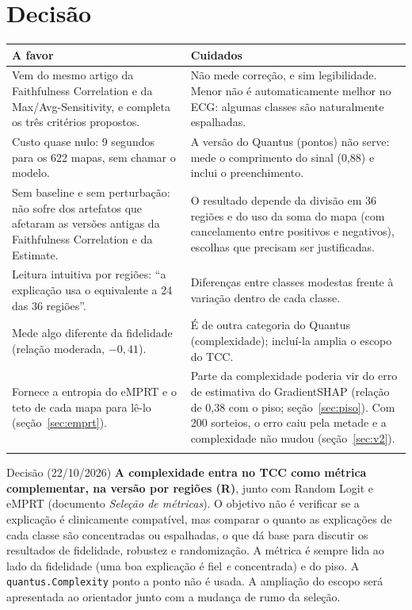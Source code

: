 \documentclass[11pt,a4paper]{article}
\begin{document}
\section{Decisão}\label{sec:decisao}
\begin{center}\small
\begin{tabularx}{\linewidth}{XX}
\toprule
\textbf{A favor} & \textbf{Cuidados} \\
\midrule
Vem do mesmo artigo da Faithfulness Correlation e da Max/Avg-Sensitivity, e completa os três critérios propostos. & Não mede correção, e sim legibilidade. Menor não é automaticamente melhor no ECG: algumas classes são naturalmente espalhadas. \\ \addlinespace
Custo quase nulo: 9 segundos para os 622 mapas, sem chamar o modelo. & A versão do Quantus (pontos) não serve: mede o comprimento do sinal (0,88) e inclui o preenchimento. \\ \addlinespace
Sem baseline e sem perturbação: não sofre dos artefatos que afetaram as versões antigas da Faithfulness Correlation e da Estimate. & O resultado depende da divisão em 36 regiões e do uso da soma do mapa (com cancelamento entre positivos e negativos), escolhas que precisam ser justificadas. \\ \addlinespace
Leitura intuitiva por regiões: “a explicação usa o equivalente a 24 das 36 regiões”. & Diferenças entre classes modestas frente à variação dentro de cada classe. \\ \addlinespace
Mede algo diferente da fidelidade (relação moderada, $-0{,}41$). & É de outra categoria do Quantus (complexidade); incluí-la amplia o escopo do TCC. \\ \addlinespace
Fornece a entropia do eMPRT e o teto de cada mapa para lê-lo (seção~\ref{sec:emprt}). & Parte da complexidade poderia vir do erro de estimativa do GradientSHAP (relação de 0,38 com o piso; seção~\ref{sec:piso}). Com 200 sorteios, o erro caiu pela metade e a complexidade não mudou (seção~\ref{sec:v2}). \\ \addlinespace
\bottomrule
\end{tabularx}
\end{center}

\begin{infobox}[ok]{Decisão (22/10/2026)}
\textbf{A complexidade entra no TCC como métrica complementar, na versão por regiões (R)}, junto com Random Logit e eMPRT (documento \textit{Seleção de métricas}). O objetivo não é verificar se a explicação é clinicamente compatível, mas comparar o quanto as explicações de cada classe são concentradas ou espalhadas, o que dá base para discutir os resultados de fidelidade, robustez e randomização. A métrica é sempre lida ao lado da fidelidade (uma boa explicação é fiel \textit{e} concentrada) e do piso. A \texttt{quantus.Complexity} ponto a ponto não é usada. A ampliação do escopo será apresentada ao orientador junto com a mudança de rumo da seleção.
\end{infobox}
\end{document}
